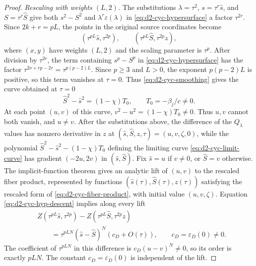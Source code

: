 \documentclass[11pt,letterpaper]{article}
\numberwithin{equation}{section}
\theoremstyle{remark}
\theoremstyle{plain}
\begin{document}
\begin{proof}
\smallskip
\noindent\emph{Rescaling with weights $(L,2)$.}
The substitutions $\lambda=\tau^2$, $s=\tau^r\widehat s$, and
$S=\tau^r\widehat S$ give both $s^2-S^2$ and
$\lambda^r\varepsilon(\lambda)$ in \eqref{eq:d2-cyc-hypersurface}
a factor $\tau^{2r}$.
Since $2k+r=pL$, the points in the original source coordinates become
\[
 (\tau^{pL}\widehat s,\tau^{2p}),\qquad
 (\tau^{pL}\widehat S,\tau^{2p}z),
\]
where $(x,y)$ have weights $(L,2)$ and the scaling parameter is $\tau^p$.
After division by $\tau^{2r}$, the term containing
$s^p-S^p$ in \eqref{eq:d2-cyc-hypersurface} has the factor $\tau^{2\nu+rp-2r}=\tau^{p(p-2)L}$.
Since $p\geq3$ and $L>0$, the exponent $p(p-2)L$ is positive,
so this term vanishes at $\tau=0$.
Thus \eqref{eq:d2-cyc-smoothing} gives the curve obtained at $\tau=0$
\begin{equation}
 \widehat S^2-\widehat s^2=(1-\chi)T_0,
 \qquad T_0=-\beta_j/c\neq0.
 \label{eq:d2-cyc-limit-curve}
\end{equation}
At each point $(u,v)$ of this curve,
$v^2-u^2=(1-\chi)T_0\neq0$.
Thus $u,v$ cannot both vanish, and $u\neq v$.
After the substitutions above, the difference of the $Q_\lambda$
values has nonzero derivative in $z$ at
$(\widehat s,\widehat S,z,\tau)=(u,v,\zeta,0)$, while the polynomial
$\widehat S^2-\widehat s^2-(1-\chi)T_0$ defining the limiting curve
\eqref{eq:d2-cyc-limit-curve} has gradient $(-2u,2v)$ in
$(\widehat s,\widehat S)$.
Fix $\widehat s=u$ if $v\neq0$, or $\widehat S=v$ otherwise.
The implicit-function theorem gives an analytic lift of $(u,v)$ to
the rescaled fiber product, represented by functions
$(\widehat s(\tau),\widehat S(\tau),z(\tau))$ satisfying the rescaled
form of \eqref{eq:d2-cyc-fiber-product}, with initial value $(u,v,\zeta)$.
Equation \eqref{eq:d2-cyc-hyp-descent} implies along every lift
\begin{equation}
 \begin{aligned}
 &Z(\tau^{pL}\widehat s,\tau^{2p})
   -Z(\tau^{pL}\widehat S,\tau^{2p}z)\\
 &\qquad=\tau^{pLN}(\widehat s-\widehat S)^N(c_D+O(\tau)),
 \qquad c_D=\varepsilon_D(0)\neq0.                  \label{eq:d2-cyc-primitiveD}
 \end{aligned}
\end{equation}
The coefficient of $\tau^{pLN}$ in this difference is
$c_D(u-v)^N\neq0$, so its order is exactly $pLN$.
The constant $c_D=\varepsilon_D(0)$ is independent of the lift.


\end{proof}
\end{document}
